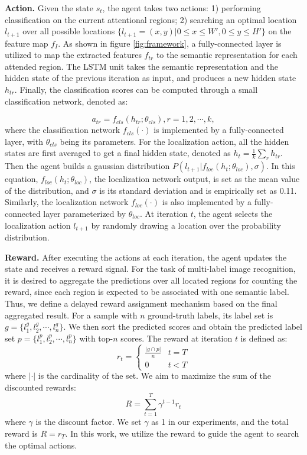 \documentclass[letterpaper]{article} %
\begin{document}
\noindent\textbf{Action.} Given the state $s_t$, the agent takes two actions: 1) performing classification on the current attentional regions; 2) searching an optimal location $l_{t+1}$ over all possible locations $\{l_{t+1}=(x,y)|0\le{x}\le{W'},0\le{y}\le{H'}\}$ on the feature map $f_I$. As shown in figure \ref{fig:framework}, a fully-connected layer is utilized to map the extracted features $f_{tr}$ to the semantic representation for each attended region. The LSTM unit takes the semantic representation and the hidden state of the previous iteration as input, and produces a new hidden state $h_{tr}$. Finally, the classification scores can be computed through a small classification network, denoted as:

 \begin{equation}
      a_{tr}=f_{cls}(h_{tr};\theta_{cls}), r=1,2,\cdots,k,
\end{equation}
where the classification network $f_{cls}(\cdot)$ is implemented by a fully-connected layer, with $\theta_{cls}$ being its parameters. For the localization action, all the hidden states are first averaged to get a final hidden state, denoted as $h_t=\frac{1}{k}\sum_r{h_{tr}}$. Then the agent builds a gaussian distribution $P(l_{t+1}|f_{loc}(h_t;\theta_{loc}), \sigma)$. In this equation, $f_{loc}(h_t;\theta_{loc})$, the localization network output, is set as the mean value of the distribution, and $\sigma$ is its standard deviation and is empirically set as 0.11. Similarly, the localization network $f_{loc}(\cdot)$ is also implemented by a fully-connected layer parameterized by $\theta_{loc}$. At iteration $t$, the agent selects the localization action $l_{t+1}$ by randomly drawing a location over the probability distribution.


\noindent\textbf{Reward.}  After executing the actions at each iteration, the agent updates the state and receives a reward signal. For the task of multi-label image recognition, it is desired to aggregate the predictions over all located regions for counting the reward, since each region is expected to be associated with one semantic label. Thus, we define a delayed reward assignment mechanism based on the final aggregated result. For a sample with $n$ ground-truth labels, its label set is $g=\{l_1^g, l_2^g, \cdots, l_n^g\}$. We then sort the predicted scores and obtain the predicted label set $p=\{l_1^p, l_2^p, \cdots, l_n^p\}$ with top-$n$ scores. The reward at iteration $t$ is defined as:
\begin{equation}
    r_t=
   \begin{cases}
    \frac{|g\cap{p}|}{n} &\mbox{$t=T$}\\
    0 &\mbox{$t<T$}
   \end{cases}
\end{equation}
where $|\cdot|$ is the cardinality of the set. We aim to maximize the sum of the discounted rewards:
 \begin{equation}
      R=\sum_{t=1}^T{\gamma^{t-1}r_t}
\end{equation}
where $\gamma$ is the discount factor. We set $\gamma$ as 1 in our experiments, and the total reward is $R=r_T$. In this work, we utilize the reward to guide the agent to search the optimal actions.
\end{document}
